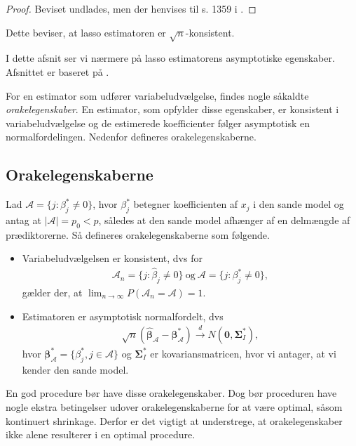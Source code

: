 \begin{proof}
Beviset undlades, men der henvises til s. 1359 i \citep{adaptive_lasso_knight}.
\end{proof}
Dette beviser, at lasso estimatoren er \(\sqrt{n}\)-konsistent.
\newpage



I dette afsnit ser vi nærmere på lasso estimatorens asymptotiske egenskaber. 
Afsnittet er baseret på \citep{adaptive_lasso}.

For en estimator som udfører variabeludvælgelse, findes nogle såkaldte \textit{orakelegenskaber}.
En estimator, som opfylder disse egenskaber, er konsistent i variabeludvælgelse og de estimerede koefficienter følger asymptotisk en normalfordelingen.
Nedenfor defineres orakelegenskaberne.

\subsection{Orakelegenskaberne} 
Lad $\mathcal{A} =\{j:\beta_j^* \neq 0\}$, hvor $\beta_j^*$ betegner koefficienten af $x_j$ i den sande model og antag at $\vert \mathcal{A} \vert=p_0 <p$, således at den sande model afhænger af en delmængde af prædiktorerne. 
Så defineres orakelegenskaberne som følgende. 
\begin{defn}[Orakelegenskaber]
\begin{itemize}
\item Variabeludvælgelsen er konsistent, dvs for
\begin{align*}
\mathcal{A}_n=\lbrace j :\hat{\beta}_j \neq 0 \rbrace \ \text{og} \ \mathcal{A} =\{j:\beta_j^* \neq 0\},
\end{align*}
gælder der, at $\lim_{n \rightarrow \infty }P(\mathcal{A}_n=\mathcal{A})=1$.
\item Estimatoren er asymptotisk normalfordelt, dvs
\begin{align*}
\sqrt{n}(\hat{\boldsymbol{\beta}}_\mathcal{A}-\boldsymbol{\beta}^*_\mathcal{A}) \overset{d}{\rightarrow} N(\mathbf{0}, \boldsymbol{\Sigma}^*_I),
\end{align*}
hvor $\boldsymbol{\beta}^*_\mathcal{A}=\{ \beta_j^*, j \in \mathcal{A} \}$ og $\boldsymbol{\Sigma}^*_I$ er kovariansmatricen, hvor vi antager, at vi kender den sande model.
\end{itemize}
\end{defn}
En god procedure bør have disse orakelegenskaber.
Dog bør proceduren have nogle ekstra betingelser udover orakelegenskaberne for at være optimal, såsom kontinuert shrinkage.
Derfor er det vigtigt at understrege, at orakelegenskaber ikke alene resulterer i en optimal procedure.

